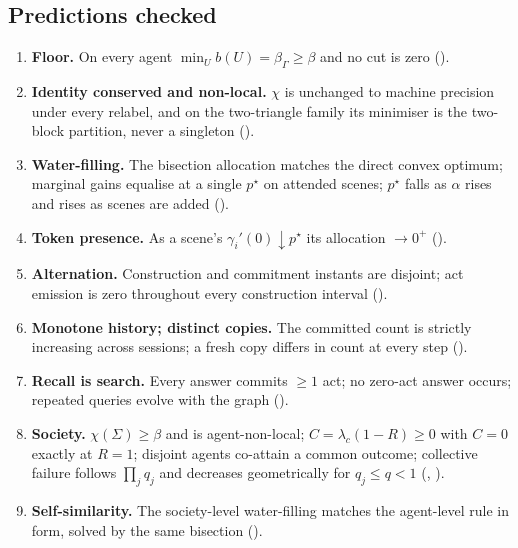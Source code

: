 \documentclass[11pt,twocolumn,a4paper]{article}
\newcommand{\Self}{\Gamma}          %
\newcommand{\floorc}{\beta}          %
\newcommand{\Char}{\chi}             %
\newcommand{\att}{\alpha}            %
\newcommand{\price}{p^{\star}}       %
\newcommand{\Ord}{R}                 %
\newcommand{\Soc}{\Sigma}            %
\begin{document}
\subsection{Predictions checked}

\begin{enumerate}[label=\textbf{(V\arabic*)},leftmargin=*]
\item \textbf{Floor.} On every agent $\min_U b(U)=\floorc_\Self\ge\floorc$
and no cut is zero ().
\item \textbf{Identity conserved and non-local.} $\Char$ is unchanged to
machine precision under every relabel, and on the two-triangle family its
minimiser is the two-block partition, never a singleton
().
\item \textbf{Water-filling.} The bisection allocation matches the direct
convex optimum; marginal gains equalise at a single $\price$ on attended
scenes; $\price$ falls as $\att$ rises and rises as scenes are added
().
\item \textbf{Token presence.} As a scene's $\gamma_i'(0)\downarrow\price$
its allocation $\to0^+$ ().
\item \textbf{Alternation.} Construction and commitment instants are
disjoint; act emission is zero throughout every construction interval
().
\item \textbf{Monotone history; distinct copies.} The committed count is
strictly increasing across sessions; a fresh copy differs in count at
every step ().
\item \textbf{Recall is search.} Every answer commits $\ge1$ act; no
zero-act answer occurs; repeated queries evolve with the graph
().
\item \textbf{Society.} $\Char(\Soc)\ge\floorc$ and is agent-non-local;
$C=\lambda_c(1-\Ord)\ge0$ with $C=0$ exactly at $\Ord=1$; disjoint agents
co-attain a common outcome; collective failure follows $\prod_j q_j$ and
decreases geometrically for $q_j\le q<1$ (,
).
\item \textbf{Self-similarity.} The society-level water-filling matches the
agent-level rule in form, solved by the same bisection
().
\end{enumerate}
\end{document}
